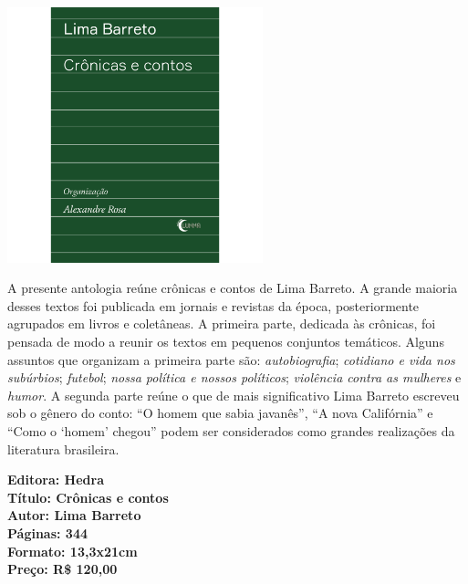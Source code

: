 \pagebreak

\begin{center}
\hspace*{-3.6cm}
\hspace*{3.1cm}\includegraphics[width=74mm]{./grid/barreto.png}
\end{center}

\hspace*{-7cm}\hrulefill\hspace*{-7cm}

\medskip

\noindent{}A presente antologia reúne crônicas e contos de Lima Barreto. A grande maioria desses textos foi publicada em jornais e revistas da época, posteriormente agrupados em livros e coletâneas. A primeira parte, dedicada às crônicas, foi pensada de modo a reunir os textos em pequenos conjuntos temáticos. Alguns assuntos que organizam a primeira parte são: \textit{autobiografia}; \textit{cotidiano e vida nos subúrbios}; \textit{futebol}; \textit{nossa política e nossos políticos}; \textit{violência contra as mulheres} e \textit{humor}. A segunda parte reúne o que de mais significativo Lima Barreto escreveu sob o gênero do conto: ``O homem que sabia javanês'', ``A nova Califórnia'' e ``Como o `homem' chegou'' podem ser considerados como grandes realizações da literatura brasileira.
\vfill

\noindent\begin{minipage}[c]{1\linewidth}
{\small\textbf{
\hspace*{-.1cm}Editora: Hedra\\
Título: Crônicas e contos\\
Autor: Lima Barreto\\ 
Páginas: 344\\
Formato: 13,3x21cm\\
Preço: R\$ 120,00\\
}}
\end{minipage}

